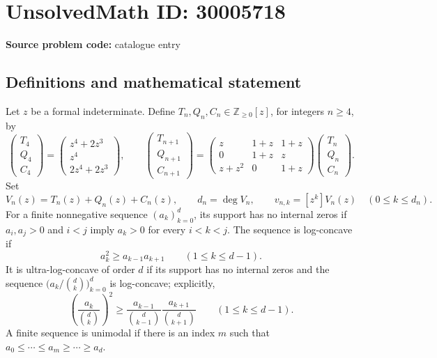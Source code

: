 \documentclass[11pt]{article}
\newcommand{\Z}{\mathbb{Z}}
\newcommand{\Q}{\mathbb{Q}}
\newcommand{\C}{\mathbb{C}}
\begin{document}
\section*{UnsolvedMath ID: 30005718}
\textbf{Source problem code:} catalogue entry
\subsection{Definitions and mathematical statement}
Let \(z\) be a formal indeterminate. Define \(T_n,Q_n,C_n\in\Z_{\geq0}[z]\), for integers \(n\geq4\), by
\[
\begin{pmatrix}T_4\\Q_4\\C_4\end{pmatrix}
=\begin{pmatrix}z^4+2z^3\\z^4\\2z^4+2z^3\end{pmatrix},\qquad
\begin{pmatrix}T_{n+1}\\Q_{n+1}\\C_{n+1}\end{pmatrix}
=\begin{pmatrix}
z&1+z&1+z\\
0&1+z&z\\
z+z^2&0&1+z
\end{pmatrix}
\begin{pmatrix}T_n\\Q_n\\C_n\end{pmatrix}.
\]
Set
\[
V_n(z)=T_n(z)+Q_n(z)+C_n(z),\qquad d_n=\deg V_n,\qquad
v_{n,k}=[z^k]V_n(z)\quad(0\leq k\leq d_n).
\]
For a finite nonnegative sequence \((a_k)_{k=0}^{d}\), its support has no internal zeros if \(a_i,a_j>0\) and \(i<j\) imply \(a_k>0\) for every \(i<k<j\). The sequence is log-concave if
\[
a_k^2\geq a_{k-1}a_{k+1}\qquad(1\leq k\leq d-1).
\]
It is ultra-log-concave of order \(d\) if its support has no internal zeros and the sequence \(\bigl(a_k/\binom{d}{k}\bigr)_{k=0}^{d}\) is log-concave; explicitly,
\[
\left(\frac{a_k}{\binom{d}{k}}\right)^2
\geq
\frac{a_{k-1}}{\binom{d}{k-1}}
\frac{a_{k+1}}{\binom{d}{k+1}}
\qquad(1\leq k\leq d-1).
\]
A finite sequence is unimodal if there is an index \(m\) such that \(a_0\leq\cdots\leq a_m\geq\cdots\geq a_d\).
\end{document}
